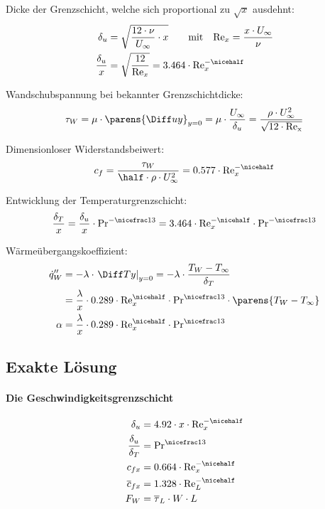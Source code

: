 			Dicke der Grenzschicht, welche sich proportional zu $\sqrt x$ ausdehnt:
			\begin{align*}
				\delta_u &= \sqrt{\frac{12 \cdot \nu}{U_\infty} \cdot x} \qquad \text{mit} \quad \mathrm{Re}_x = \frac{x \cdot U_\infty}{\nu} \\
				\frac {\delta_u} x &= \sqrt{\frac{12}{\mathrm{Re}_x}} = 3.464 \cdot \mathrm{Re}_x^{-\nicehalf}
			\end{align*}

			Wandschubspannung bei bekannter Grenzschichtdicke:
			\[
				\tau_W = \mu \cdot \parens{\Diff u y}_{y=0} = \mu \cdot \frac{U_\infty}{\delta_u} = \frac{\rho \cdot U_\infty^2}{\sqrt{12 \cdot \mathrm{Re_x}}}
			\]

			Dimensionloser Widerstandsbeiwert:
			\[
				c_f = \frac{\tau_W}{\half \cdot \rho \cdot U_\infty^2} = 0.577 \cdot \mathrm{Re}_x^{-\nicehalf}
			\]

			Entwicklung der Temperaturgrenzschicht:
			\[
				\frac{\delta_T}{x} = \frac{\delta_u}{x} \cdot
					\mathrm{Pr}^{-\nicefrac 1 3} = 3.464 \cdot \mathrm{Re}_x^{-\nicehalf}
					\cdot \mathrm{Pr}^{-\nicefrac 1 3}
			\]

			Wärmeübergangskoeffizient:
			\begin{align*}
				\dot q_W'' &= -\lambda \cdot \left. \Diff T y \right|_{y=0} = - \lambda \cdot \frac{T_W - T_\infty}{\delta_T} \\
				&= \frac \lambda x \cdot 0.289 \cdot \mathrm{Re}_x^{\nicehalf} \cdot \mathrm{Pr}^{\nicefrac 1 3} \cdot \parens{T_W - T_\infty} \\
				\alpha &= \frac \lambda x \cdot 0.289 \cdot \mathrm{Re}_x^{\nicehalf} \cdot \mathrm{Pr}^{\nicefrac 1 3}
			\end{align*}

	\subsection{Exakte Lösung} %
		\paragraph{Die Geschwindigkeitsgrenzschicht} %
			\begin{align*}
				\delta_u &= 4.92 \cdot x \cdot \mathrm{Re}_x^{-\nicehalf} \\
				\frac{\delta_u}{\delta_T} &= \mathrm{Pr}^{\nicefrac 1 3} \\
				c_{fx} &= 0.664 \cdot \mathrm{Re}_x^{-\nicehalf} \\
				\overline c_{fx} &= 1.328 \cdot \mathrm{Re}_L^{-\nicehalf} \\
				F_W &= \overline\tau_L \cdot W \cdot L
			\end{align*}


